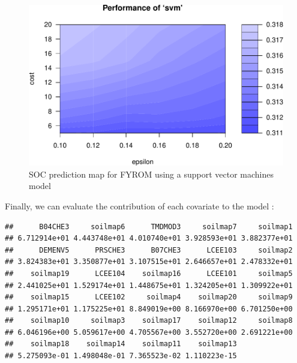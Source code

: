 \documentclass[10pt,b5paper,]{book}
\newenvironment{Shaded}{\begin{snugshade}}{\end{snugshade}}
\newcommand{\CommentTok}[1]{\textcolor[rgb]{0.56,0.35,0.01}{\textit{#1}}}
\newcommand{\ControlFlowTok}[1]{\textcolor[rgb]{0.13,0.29,0.53}{\textbf{#1}}}
\newcommand{\DataTypeTok}[1]{\textcolor[rgb]{0.13,0.29,0.53}{#1}}
\newcommand{\DecValTok}[1]{\textcolor[rgb]{0.00,0.00,0.81}{#1}}
\newcommand{\KeywordTok}[1]{\textcolor[rgb]{0.13,0.29,0.53}{\textbf{#1}}}
\newcommand{\NormalTok}[1]{#1}
\newcommand{\OperatorTok}[1]{\textcolor[rgb]{0.81,0.36,0.00}{\textbf{#1}}}
\newcommand{\StringTok}[1]{\textcolor[rgb]{0.31,0.60,0.02}{#1}}
\theoremstyle{definition}
\theoremstyle{definition}
\theoremstyle{definition}
\theoremstyle{remark}
\begin{document}
\begin{figure}
\centering
\includegraphics{SOCMapping_files/figure-latex/unnamed-chunk-82-1.pdf}
\caption{\label{fig:unnamed-chunk-82}SOC prediction map for FYROM using a
support vector machines model}
\end{figure}

Finally, we can evaluate the contribution of each covariate to the model
\citep{guyon2003introduction}:

\begin{Shaded}
\end{Shaded}

\begin{verbatim}
##      B04CHE3     soilmap6      TMDMOD3     soilmap7     soilmap1 
## 6.712914e+01 4.443748e+01 4.010740e+01 3.928593e+01 3.882377e+01 
##      DEMENV5      PRSCHE3      B07CHE3      LCEE103     soilmap2 
## 3.824383e+01 3.350877e+01 3.107515e+01 2.646657e+01 2.478332e+01 
##    soilmap19      LCEE104    soilmap16      LCEE101     soilmap5 
## 2.441025e+01 1.529174e+01 1.448675e+01 1.324205e+01 1.309922e+01 
##    soilmap15      LCEE102     soilmap4    soilmap20     soilmap9 
## 1.295171e+01 1.175225e+01 8.849019e+00 8.166970e+00 6.701250e+00 
##    soilmap10     soilmap3    soilmap17    soilmap12     soilmap8 
## 6.046196e+00 5.059617e+00 4.705567e+00 3.552720e+00 2.691221e+00 
##    soilmap18    soilmap14    soilmap11    soilmap13 
## 5.275093e-01 1.498048e-01 7.365523e-02 1.110223e-15
\end{verbatim}
\end{document}
